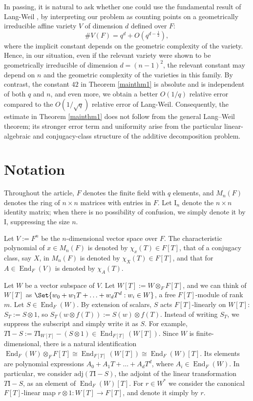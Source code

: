 \documentclass[preprint,11pt]{amsart}
\theoremstyle{definition}
\numberwithin{thm}{section}
\newcommand{\End}{\operatorname{End}}
\newcommand{\adj}{\textrm{adj}}
\newcommand{\id}{\mathrm{I}}
\begin{document}
In passing, it is natural to ask whether one could use the fundamental result of Lang-Weil \cite{LW}, by interpreting our problem as counting points on a geometrically irreducible affine variety $V$ of dimension $d$ defined over $F$:
$$
\# V(F) = q^d + O\left(q^{d - \frac{1}{2}} \right),
$$
where the implicit constant depends on the geometric complexity of the variety. Hence, in our situation, even if the relevant variety were shown to be geometrically irreducible of dimension $d =(n-1)^2$, the relevant constant may depend on $n$ and the geometric complexity of the varieties in this family. By contrast, the constant $42$ in Theorem \ref{mainthm1} is absolute and is independent of both $q$ and $n$, and even more, we obtain a better $O(1/q)$ relative error compared to the $O(1/\sqrt{q})$ relative error of Lang-Weil.  Consequently, the estimate in Theorem \ref{mainthm1} does not follow from the general Lang--Weil theorem; its stronger error term and uniformity arise from the particular linear-algebraic and conjugacy-class structure of the additive decomposition problem.


\section{Notation}\label{notation}
Throughout the article, $F$ denotes the finite field with $q$ elements, and $M_n(F)$ denotes the ring of $n \times n$ matrices with entries in $F$. Let $\id_n$ denote the $n \times n$ identity matrix; when there is no possibility of confusion, we simply denote it by $\id$, suppressing the size $n$.

Let $V := F^n$ be the $n$-dimensional vector space over $F$. The characteristic polynomial of $x \in M_n(F)$ is denoted by $\chi_x(T) \in F[T]$, that of a conjugacy class, say $X$, in $M_n(F)$ is denoted by $\chi_X(T) \in F[T]$, and that for $A \in \End_{F}(V)$ is denoted by $\chi_A(T)$.
 
Let $W$ be a vector subspace of $V$. Let $W[T] := W \otimes_{F} F[T]$, and we can think of $W[T]$ as $\Set{ w_0 + w_1 T + \ldots + w_d T^d : w_i \in W}$, a free $F[T]$-module of rank $m$. Let $S \in \End_{F}(W)$. By extension of scalars, $S$ acts $F[T]$-linearly on $W[T]$: $S_T := S \otimes 1$, so $S_T(w \otimes f(T)) := S(w) \otimes f(T)$. Instead of writing $S_T$, we suppress the subscript and simply write it as $S.$ For example, $T \id -S := T \id_{W[T]} - (S \otimes 1 ) \in \End_{F[T]}(W[T])$. Since $W$ is finite-dimensional, there is a natural identification $\End_{F}(W) \otimes_{F} F[T] \cong \End_{F[T]}(W[T]) \cong \End_{F}(W)[T]$. Its elements are polynomial expressions $A_0 + A_1 T + \ldots + A_d T^d$, where $A_i \in \End_{F}(W)$. In particular, we consider  $\adj(T \id-S)$, the adjoint of the linear transformation $T \id -S$,  as an element of $\End_{F}(W)[T]$. For $r \in W^*$ we consider the canonical $F[T]$-linear map $r \otimes 1 : W[T] \to F[T]$, and denote it simply by $r$.
\end{document}
